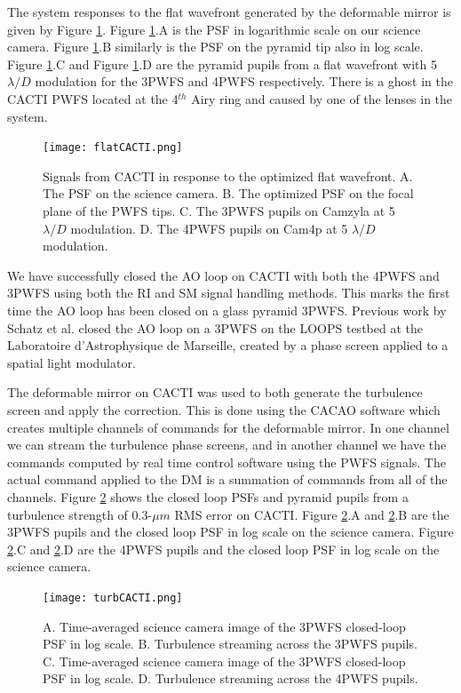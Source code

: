  The system responses to the flat wavefront generated by the deformable mirror is given by Figure \ref{fig:flatCACTI}. Figure \ref{fig:flatCACTI}.A is the PSF in logarithmic scale on our science camera. Figure \ref{fig:flatCACTI}.B similarly is the PSF on the pyramid tip also in log scale. Figure  \ref{fig:flatCACTI}.C and Figure \ref{fig:flatCACTI}.D are the pyramid pupils from a flat wavefront with 5$\lambda/D$ modulation for the 3PWFS and 4PWFS respectively. There is a ghost in the CACTI PWFS located at the 4$^{th}$ Airy ring and caused by one of the lenses in the system. 

\begin{figure}
    \centering
    \texttt{[image: flatCACTI.png]}
    \caption{Signals from CACTI in response to the optimized flat wavefront. A. The PSF on the science camera. B. The optimized PSF on the focal plane of the PWFS tips. C. The 3PWFS pupils on Camzyla at 5 $\lambda/D$ modulation. D. The 4PWFS pupils on Cam4p at 5 $\lambda/D$ modulation.}
    \label{fig:flatCACTI}
\end{figure}


We have successfully closed the AO loop on CACTI with both the 4PWFS and 3PWFS using both the RI and SM signal handling methods. This marks the first time the AO loop has been closed on a glass pyramid 3PWFS. Previous work by Schatz et al. closed the AO loop on a 3PWFS on the LOOPS testbed at the Laboratoire d'Astrophysique de Marseille, created by a phase screen applied to a spatial light modulator. 


The deformable mirror on CACTI was used to both generate the turbulence screen and apply the correction. This is done using the CACAO software which creates multiple channels of commands for the deformable mirror. In one channel we can stream the turbulence phase screens, and in another channel we have the commands computed by real time control software using the PWFS signals. The actual command applied to the DM is a summation of commands from all of the channels. Figure \ref{fig:turbCACTI} shows the closed loop PSFs and pyramid pupils from a turbulence strength of 0.3-$\mu m$ RMS error on CACTI. Figure \ref{fig:turbCACTI}.A and \ref{fig:turbCACTI}.B are the 3PWFS pupils and the closed loop PSF in log scale on the science camera. Figure \ref{fig:turbCACTI}.C and \ref{fig:turbCACTI}.D are the 4PWFS pupils and the closed loop PSF in log scale on the science camera.


\begin{figure}
    \centering
    \texttt{[image: turbCACTI.png]}
    \caption{A. Time-averaged science camera image of the 3PWFS closed-loop PSF in log scale. B. Turbulence streaming across the 3PWFS pupils. C. Time-averaged science camera image of the 3PWFS closed-loop PSF in log scale. D. Turbulence streaming across the 4PWFS pupils.}
    \label{fig:turbCACTI}
\end{figure}

